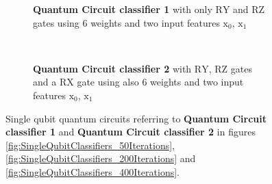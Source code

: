 \begin{figure}[h!]
    \centering
    
    \begin{subfigure}{1.0\textwidth}
        \centering
        \caption{\textbf{Quantum Circuit classifier 1} with only $\mathrm{RY}$ and $\mathrm{RZ}$ gates using 6 weights and two input features $\mathrm{x_0}$, $\mathrm{x_1}$ }
        \label{fig:single_qubit_circuit_1}
    \end{subfigure}
    \\[2ex]
    \begin{subfigure}{1.0\textwidth}
        \centering
        \caption{\textbf{Quantum Circuit classifier 2} with $\mathrm{RY}$, $\mathrm{RZ}$ gates and a $\mathrm{RX}$ gate using also 6 weights and two input features $\mathrm{x_0}$, $\mathrm{x_1}$ }
        \label{fig:single_qubit_circuit_2}
    \end{subfigure}
    
    \caption{Single qubit quantum circuits referring to \textbf{Quantum Circuit classifier 1} and \textbf{Quantum Circuit classifier 2} in figures \ref{fig:SingleQubitClassifiers_50Iterations}, \ref{fig:SingleQubitClassifiers_200Iterations} and \ref{fig:SingleQubitClassifiers_400Iterations}.}
    \label{fig:single_qubit_circuits}
\end{figure}

